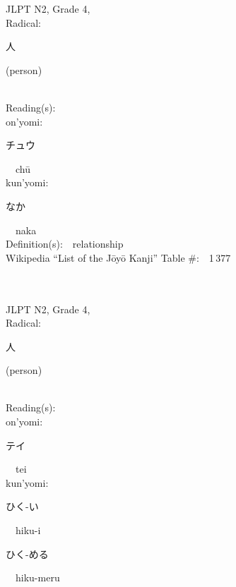 \begin{multicols}{2}
{JLPT N2, Grade 4, \\Radical:\ \ {\begin{CJK}{UTF8}{min} 人 \end{CJK}} (person) } \\
Reading(s):\ \ \\
{\hspace*{1em}}on'yomi:\ \ \\
{\hspace*{2em}}{\begin{CJK}{UTF8}{min} チュウ \end{CJK}}\ \ ch\=u\ \ \\
{\hspace*{1em}}kun'yomi:\ \ \\
{\hspace*{2em}}{\begin{CJK}{UTF8}{min} なか \end{CJK}}\ \ naka\ \ \\
Definition(s):\ \ relationship \\
Wikipedia ``List of the J\=oy\=o Kanji'' Table \#:\ \ 1\,377 \\
\ \ \\
{\fontsize{34pt}{40pt}  }\ \ \\  %
{JLPT N2, Grade 4, \\Radical:\ \ {\begin{CJK}{UTF8}{min} 人 \end{CJK}} (person) } \\
Reading(s):\ \ \\
{\hspace*{1em}}on'yomi:\ \ \\
{\hspace*{2em}}{\begin{CJK}{UTF8}{min} テイ \end{CJK}}\ \ tei\ \ \\
{\hspace*{1em}}kun'yomi:\ \ \\
{\hspace*{2em}}{\begin{CJK}{UTF8}{min} ひく-い \end{CJK}}\ \ hiku-i\ \ \\
{\hspace*{2em}}{\begin{CJK}{UTF8}{min} ひく-める \end{CJK}}\ \ hiku-meru\ \ \\

\end{multicols}
